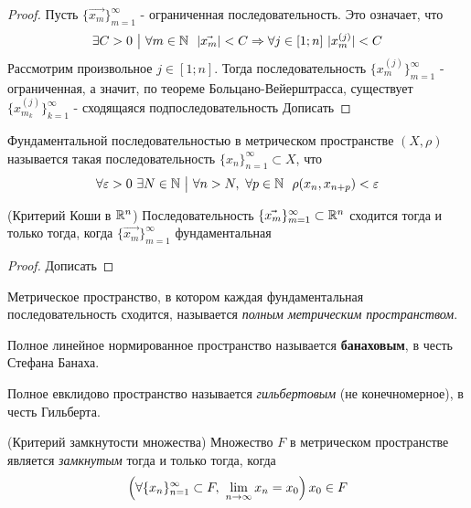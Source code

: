 \begin{proof}
	Пусть $\{\vec{x_m}\}_{m = 1}^\infty$ - ограниченная последовательность. Это означает, что
	\[
		\exists C > 0 \such \forall m \in \N\ \ |\vec{x_m}| < C \Ra \forall j \in [1; n]\ |x_m^{(j)}| < C
	\]
	Рассмотрим произвольное $j \in [1; n]$. Тогда последовательность $\{x_m^{(j)}\}_{m = 1}^\infty$ - ограниченная, а значит, по теореме Больцано-Вейерштрасса, существует $\{x_{m_k}^{(j)}\}_{k = 1}^\infty$ - сходящаяся подпоследовательность
	Дописать
\end{proof}

\begin{definition}
	Фундаментальной последовательностью в метрическом пространстве $(X, \rho)$ называется такая последовательность $\{x_n\}_{n = 1}^\infty \subset X$, что
	\[
		\forall \varepsilon > 0\ \exists N \in \mathbb{N} \ \big|\  \forall n > N,\ \forall p \in \mathbb{N}\ \ \rho(x_n, x_{n + p}) < \varepsilon
	\]
\end{definition}

\begin{theorem} (Критерий Коши в $\mathbb{R}^n$)
	Последовательность $\{\vec{x_m}\}_{m = 1}^\infty \subset \mathbb{R}^n$ сходится тогда и только тогда, когда $\{\vec{x_m}\}_{m = 1}^\infty$ фундаментальная
\end{theorem}

\begin{proof}
	Дописать
\end{proof}

\begin{definition}
	Метрическое пространство, в котором каждая фундаментальная последовательность сходится, называется \textit{полным метрическим пространством}.
	
	Полное линейное нормированное пространство называется \textbf{банаховым}, в честь Стефана Банаха.
	
	Полное евклидово пространство называется \textit{гильбертовым} (не конечномерное), в честь Гильберта.
\end{definition}

\begin{theorem} (Критерий замкнутости множества)
	Множество $F$ в метрическом пространстве является \textit{замкнутым} тогда и только тогда, когда
	\[
		\left(\forall \{x_n\}_{n = 1}^\infty \subset F,\ \lim\limits_{n \to \infty} x_n = x_0\right) x_0 \in F
	\]
\end{theorem}

